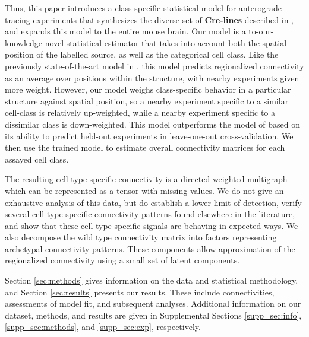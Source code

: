 Thus, this paper introduces a class-specific statistical model for anterograde tracing experiments that synthesizes the diverse set of \textbf{Cre-lines} described in \citet{Harris2019-mr}, and expands this model to the entire mouse brain.
Our model is a to-our-knowledge novel statistical estimator that takes into account both the spatial position of the labelled source, as well as the categorical cell class.
Like the previously state-of-the-art model in \citet{Knox2019-ot}, this model predicts regionalized connectivity as an average over positions within the structure, with nearby experiments given more weight.
However, our model weighs class-specific behavior in a particular structure against spatial position, so a nearby experiment specific to a similar cell-class is relatively up-weighted, while a nearby experiment specific to a dissimilar class is down-weighted.
This model outperforms the model of  \citet{Knox2019-ot} based on its ability to predict held-out experiments in leave-one-out cross-validation.
We then use the trained model to estimate overall connectivity matrices for each assayed cell class.

The resulting cell-type specific connectivity is a directed weighted multigraph which can be represented as a tensor with missing values.
We do not give an exhaustive analysis of this data, but do establish a lower-limit of detection, verify several cell-type specific connectivity patterns found elsewhere in the literature, and show that these cell-type specific signals are behaving in expected ways.
We also decompose the wild type connectivity matrix into factors representing archetypal connectivity patterns.
These components allow approximation of the regionalized connectivity using a small set of latent components.

Section \ref{sec:methods} gives information on the data and statistical methodology, and Section \ref{sec:results} presents our results.
These include connectivities, assessments of model fit, and subsequent analyses.
Additional information on our dataset, methods, and results are given in Supplemental Sections \ref{supp_sec:info}, \ref{supp_sec:methods}, and \ref{supp_sec:exp}, respectively.